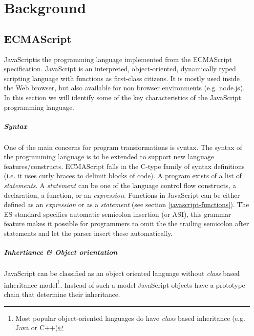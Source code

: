
\chapter{Background} %

\label{Chapter2}


\section{ECMAScript}
JavaScript\footnotemark is the programming language implemented from the ECMAScript specification\cite{SpecJS}. JavaScript is an interpreted, object-oriented, dynamically typed scripting language with functions as first-class citizens. It is mostly used inside the Web browser, but also available for non browser environments (e.g. node.js). In this section we will identify some of the key characteristics of the JavaScript programming language.

\paragraph{Syntax} \label{javascript-syntax}
One of the main concerns for program transformations is syntax. The syntax of the programming language is to be extended to support new language features/constructs. ECMAScript falls in the C-type family %
of syntax definitions (i.e. it uses curly braces to delimit blocks of code).
A program exists of a list of \textit{statements}. A \textit{statement} can be one of the language control flow constructs, a declaration, a function, or an \textit{expression}. Functions in JavaScript can be either defined as an \textit{expression} or as a \textit{statement} (see section \ref{javascript-functions}). The ES standard specifies automatic semicolon insertion (or ASI), this grammar feature makes it possible for programmers to omit the the trailing semicolon after statements and let the parser insert these automatically.

\paragraph{Inhertiance \& Object orientation} \label{javascript-inheritance}
JavaScript can be classified as an object oriented language without \textit{class} based inheritance model\footnote{Most popular object-oriented languages do have \textit{class} based inheritance (e.g. Java or C++)}. Instead of such a model JavaScript objects have a prototype chain that determine their inheritance.

